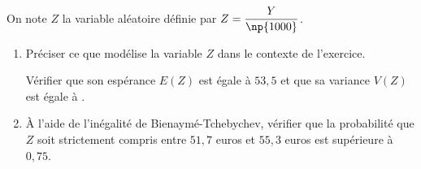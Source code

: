 On note $Z$ la variable aléatoire définie par $Z = \dfrac{Y}{\np{1000}}$.

\begin{enumerate}[resume]
\item Préciser ce que modélise la variable $Z$ dans le contexte de l'exercice.

Vérifier que son espérance $E(Z)$ est égale à $53,5$ et que sa variance $V(Z)$ est égale à .
\item À l'aide de l'inégalité de Bienaymé-Tchebychev, vérifier que la probabilité que $Z$ soit strictement compris entre $51,7$ euros et $55,3$ euros est supérieure à $0,75$.
\end{enumerate}

\bigskip
